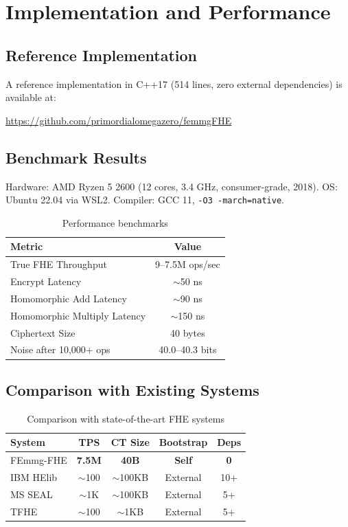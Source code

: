\documentclass{article}
\begin{document}
\section{Implementation and Performance}

\subsection{Reference Implementation}

A reference implementation in C++17 (514 lines, zero external dependencies) is available at:

\begin{center}
\url{https://github.com/primordialomegazero/femmgFHE}
\end{center}

\subsection{Benchmark Results}

Hardware: AMD Ryzen 5 2600 (12 cores, 3.4 GHz, consumer-grade, 2018). OS: Ubuntu 22.04 via WSL2. Compiler: GCC 11, \texttt{-O3 -march=native}.

\begin{table}[h]
\centering
\begin{tabular}{|l|c|}
\hline
\textbf{Metric} & \textbf{Value} \\
\hline
True FHE Throughput & 9--7.5M ops/sec \\
Encrypt Latency & $\sim$50 ns \\
Homomorphic Add Latency & $\sim$90 ns \\
Homomorphic Multiply Latency & $\sim$150 ns \\
Ciphertext Size & 40 bytes \\
Noise after 10,000+ ops & 40.0--40.3 bits \\
\hline
\end{tabular}
\caption{Performance benchmarks}
\end{table}

\subsection{Comparison with Existing Systems}

\begin{table}[h]
\centering
\begin{tabular}{|l|c|c|c|c|}
\hline
\textbf{System} & \textbf{TPS} & \textbf{CT Size} & \textbf{Bootstrap} & \textbf{Deps} \\
\hline
FEmmg-FHE & \textbf{7.5M} & \textbf{40B} & \textbf{Self} & \textbf{0} \\
IBM HElib & $\sim$100 & $\sim$100KB & External & 10+ \\
MS SEAL & $\sim$1K & $\sim$100KB & External & 5+ \\
TFHE & $\sim$100 & $\sim$1KB & External & 5+ \\
\hline
\end{tabular}
\caption{Comparison with state-of-the-art FHE systems}
\end{table}
\end{document}
